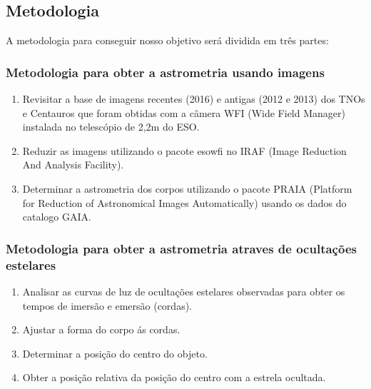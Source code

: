 \documentclass[a4paper, 11pt]{article}
\begin{document}
  
\subsection{Metodologia}

A metodologia para conseguir nosso objetivo será dividida em três partes:

\subsubsection{Metodologia para obter a astrometria usando imagens}
\begin{enumerate}
  \item Revisitar a base de imagens recentes (2016) e antigas (2012 e 2013) dos TNOs e Centauros que foram obtidas com a câmera WFI (Wide Field Manager) instalada no telescópio de 2,2m do ESO.
  \item Reduzir as imagens utilizando o pacote esowfi no IRAF (Image Reduction And Analysis Facility). 
  \item Determinar a astrometria dos corpos utilizando o pacote PRAIA (Platform for Reduction of Astronomical Images Automatically) usando os dados do catalogo GAIA.
\end{enumerate}

\subsubsection{Metodologia para obter a astrometria atraves de ocultações estelares}
\begin{enumerate}
  \item Analisar as curvas de luz de ocultações estelares observadas para obter os tempos de imersão e emersão (cordas).
  \item Ajustar a forma do corpo ás cordas.
  \item Determinar a posição do centro do objeto.
  \item Obter a posição relativa da posição do centro com a estrela ocultada.
\end{enumerate}
\end{document}
